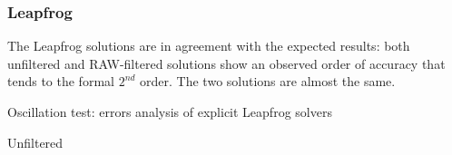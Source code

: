 \subsubsection{Leapfrog}

The Leapfrog solutions are in agreement with the expected results: both unfiltered and RAW-filtered solutions show an observed order of accuracy that tends to the formal $2^{nd}$ order. The two solutions are almost the same.

\begin{table}[!ht]
  \centering
  \caption{Oscillation test: errors analysis of explicit Leapfrog solvers}\label{tab:oscillation_errors_lf}
  \begin{subtable}[b]{0.40\textwidth}
    \centering
    \caption{Unfiltered}\label{tab:oscillation-leapfrog}
  \end{subtable}\quad%
  \begin{subtable}[b]{0.40\textwidth}
    \centering
    \caption{RAW-filtered}\label{tab:oscillation-leapfrog-raw}
\end{subtable}
\end{table}
